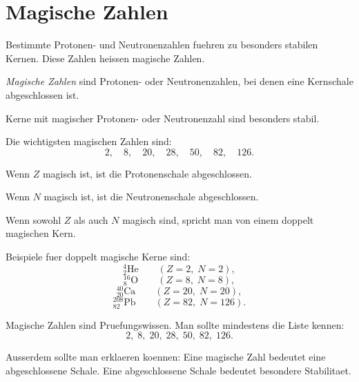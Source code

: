 \section{Magische Zahlen}

Bestimmte Protonen- und Neutronenzahlen fuehren zu besonders stabilen Kernen.
Diese Zahlen heissen magische Zahlen.

\begin{definitionbox}
\emph{Magische Zahlen} sind Protonen- oder Neutronenzahlen, bei denen eine Kernschale
abgeschlossen ist.

Kerne mit magischer Protonen- oder Neutronenzahl sind besonders stabil.
\end{definitionbox}

\begin{formulabox}
Die wichtigsten magischen Zahlen sind:
\begin{equation*}
    2,\quad 8,\quad 20,\quad 28,\quad 50,\quad 82,\quad 126.
\end{equation*}
\end{formulabox}

\begin{conceptbox}
Wenn $Z$ magisch ist, ist die Protonenschale abgeschlossen.

Wenn $N$ magisch ist, ist die Neutronenschale abgeschlossen.

Wenn sowohl $Z$ als auch $N$ magisch sind, spricht man von einem doppelt magischen
Kern.
\end{conceptbox}

\begin{examplebox}
Beispiele fuer doppelt magische Kerne sind:
\begin{equation*}
    {}^{4}_{2}\mathrm{He}
    \qquad
    (Z=2,\;N=2),
\end{equation*}
\begin{equation*}
    {}^{16}_{8}\mathrm{O}
    \qquad
    (Z=8,\;N=8),
\end{equation*}
\begin{equation*}
    {}^{40}_{20}\mathrm{Ca}
    \qquad
    (Z=20,\;N=20),
\end{equation*}
\begin{equation*}
    {}^{208}_{82}\mathrm{Pb}
    \qquad
    (Z=82,\;N=126).
\end{equation*}
\end{examplebox}

\begin{examtipbox}
Magische Zahlen sind Pruefungswissen.
Man sollte mindestens die Liste kennen:
\begin{equation*}
    2,\;8,\;20,\;28,\;50,\;82,\;126.
\end{equation*}

Ausserdem sollte man erklaeren koennen:
Eine magische Zahl bedeutet eine abgeschlossene Schale.
Eine abgeschlossene Schale bedeutet besondere Stabilitaet.
\end{examtipbox}

